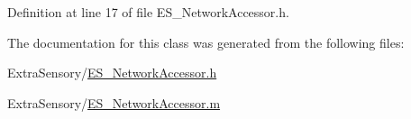 Definition at line 17 of file E\+S\+\_\+\+Network\+Accessor.\+h.



The documentation for this class was generated from the following files\+:\begin{DoxyCompactItemize}
\item 
Extra\+Sensory/\hyperlink{_e_s___network_accessor_8h}{E\+S\+\_\+\+Network\+Accessor.\+h}\item 
Extra\+Sensory/\hyperlink{_e_s___network_accessor_8m}{E\+S\+\_\+\+Network\+Accessor.\+m}\end{DoxyCompactItemize}
